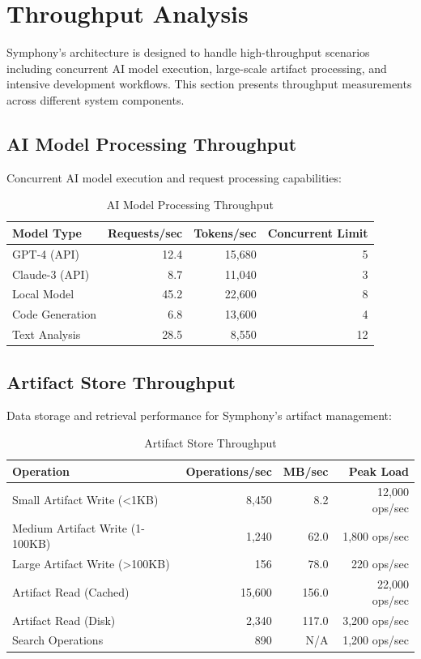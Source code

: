 \section*{Throughput Analysis}

Symphony's architecture is designed to handle high-throughput scenarios including concurrent AI model execution, large-scale artifact processing, and intensive development workflows. This section presents throughput measurements across different system components.

\subsection*{AI Model Processing Throughput}

Concurrent AI model execution and request processing capabilities:

\begin{table}[ht]
\centering
\caption{AI Model Processing Throughput}
\label{tab:ai-throughput}
\begin{tabular}{@{}lrrr@{}}
\toprule
\textbf{Model Type} & \textbf{Requests/sec} & \textbf{Tokens/sec} & \textbf{Concurrent Limit} \\
\midrule
GPT-4 (API) & 12.4 & 15,680 & 5 \\
Claude-3 (API) & 8.7 & 11,040 & 3 \\
Local Model & 45.2 & 22,600 & 8 \\
Code Generation & 6.8 & 13,600 & 4 \\
Text Analysis & 28.5 & 8,550 & 12 \\
\bottomrule
\end{tabular}
\end{table}

\subsection*{Artifact Store Throughput}

Data storage and retrieval performance for Symphony's artifact management:

\begin{table}[ht]
\centering
\caption{Artifact Store Throughput}
\label{tab:artifact-throughput}
\begin{tabular}{@{}lrrr@{}}
\toprule
\textbf{Operation} & \textbf{Operations/sec} & \textbf{MB/sec} & \textbf{Peak Load} \\
\midrule
Small Artifact Write (<1KB) & 8,450 & 8.2 & 12,000 ops/sec \\
Medium Artifact Write (1-100KB) & 1,240 & 62.0 & 1,800 ops/sec \\
Large Artifact Write (>100KB) & 156 & 78.0 & 220 ops/sec \\
Artifact Read (Cached) & 15,600 & 156.0 & 22,000 ops/sec \\
Artifact Read (Disk) & 2,340 & 117.0 & 3,200 ops/sec \\
Search Operations & 890 & N/A & 1,200 ops/sec \\
\bottomrule
\end{tabular}
\end{table}

